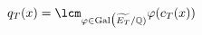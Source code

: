\documentclass[preview]{standalone}
\begin{document}
\begin{center}
$\displaystyle q_T(x) = \lcm_{\varphi \in \text{Gal}\big(\widetilde{E_T}/\mathbb{Q})} \varphi(c_T(x))$
\end{center}
\end{document}
